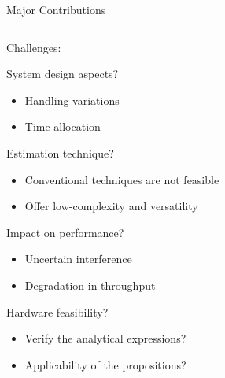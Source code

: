 \documentclass[16pt]{beamer}
\newcommand{\fs}[2]{\fontsize{#1 pt}{#2}\selectfont}
\begin{document}
\begin{frame}[t]{Major Contributions}
\begin{columns}
		\begin{column}[t]{0.48\columnwidth}
			\centering Challenges: \\[-0.2em]
				\fs{8}{8}
				\begin{block}{\footnotesize System design aspects?} %
					\begin{itemize} 
						\item Handling variations 
						\item Time allocation 
					\end{itemize}
				\end{block}
				\vspace{3.4mm}
				{
				\begin{block}{\footnotesize Estimation technique?} %
					\begin{itemize}
						\item Conventional techniques are not feasible  
						\item Offer low-complexity and versatility %
					\end{itemize}
				\end{block}
				}
				\vspace{-1.1mm}
				{
				\begin{block}{\footnotesize Impact on performance?}%
					\begin{itemize}
						\item Uncertain interference 
						\item Degradation in throughput 
					\end{itemize} 
				\end{block}
				}	
				\vspace{-0.9mm}
				{
				\begin{block}{\footnotesize Hardware feasibility?}%
					\begin{itemize}
					\item Verify the analytical expressions? 
					\item Applicability of the propositions? 
					\end{itemize}	
				\end{block}
				}
		\end{column}
		

\end{columns}
\end{frame}
\end{document}
